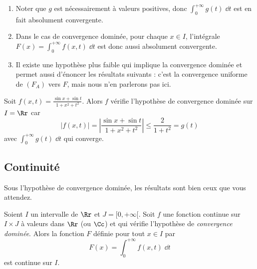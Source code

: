 \documentclass[class=report,crop=false]{standalone}
\begin{document}
\begin{remarque*}
\begin{enumerate}
  \item Noter que $g$ est nécessairement à valeurs positives, 
  donc $\int_0^{+\infty} g(t)\;\dd t$ est en fait absolument convergente.

  \item Dans le cas de convergence dominée, pour chaque $x\in I$, l'intégrale
  $F(x)=\int_0^{+\infty} f(x,t)\;\dd t$ est donc aussi absolument convergente.
  
  \item Il existe une hypothèse plus faible qui implique la convergence dominée et
  permet aussi d'énoncer les résultats suivants : c'est la convergence uniforme 
  de $(F_A)$ vers $F$, mais nous n'en parlerons pas ici.  
\end{enumerate}
\end{remarque*}


\begin{exemple}
Soit $f(x,t)=\frac{\sin x +\sin t}{1+x^2+t^2}$. Alors 
$f$ vérifie l'hypothèse de convergence dominée sur $I=\Rr$ car 
$$\big| f(x,t) \big| = \left| \frac{\sin x +\sin t}{1+x^2+t^2} \right| \le \frac{2}{1+t^2}=g(t)$$
avec $\int_0^{+\infty} g(t) \;\dd t$ qui converge.
\end{exemple}



\subsection{Continuité}


Sous l'hypothèse de convergence dominée, les résultats sont bien
ceux que vous attendez.

\begin{theoreme}
\label{th:integraleimpcontinue}
Soient $I$ un intervalle de $\Rr$ et $J=[0,+\infty[$. 
Soit $f$ une fonction continue sur $I\times J$ à valeurs dans $\Rr$ (ou $\Cc$)
et qui vérifie l'hypothèse de \emph{convergence dominée}.
Alors la fonction $F$ définie pour tout $x\in I$ par
$$
F(x) = \int_0^{+\infty} f(x,t)\;\dd t
$$ 
est continue sur $I$.
\end{theoreme}
\end{document}
